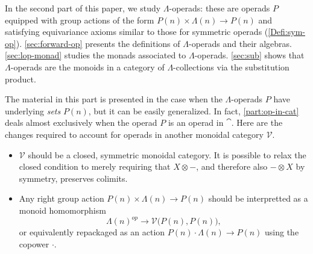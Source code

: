 

In the second part of this paper, we study $\Lambda$-operads: these are operads $P$ equipped with group actions of the form $P(n) \times \Lambda(n) \to P(n)$ and satisfying equivariance axioms similar to those for symmetric operads (\cref{Defi:sym-op}). \cref{sec:forward-op} presents the definitions of $\Lambda$-operads and their algebras.\cref{sec:lop-monad} studies the monads associated to $\Lambda$-operads. \cref{sec:sub} shows that $\Lambda$-operads are the monoids in a category of $\Lambda$-collections via the substitution product.

\begin{rem}\label{rem:lop-Venriched}
The material in this part is presented in the case when the $\Lambda$-operads $P$ have underlying \emph{sets} $P(n)$, but it can be easily generalized. In fact, \cref{part:op-in-cat} deals almost exclusively when the operad $P$ is an operad in $\cat$. Here are the changes required to account for operads in another monoidal category $\mathcal{V}$.
\begin{itemize}
\item $\mathcal{V}$ should be a closed, symmetric monoidal category. It is possible to relax the closed condition to merely requiring that $X \otimes -$, and therefore also $- \otimes X$ by symmetry, preserves colimits.
\item Any right group action $P(n) \times \Lambda(n) \to P(n)$ should be interpretted as a monoid homomorphism
\[
\Lambda(n)^{op} \to \mathcal{V} \big( P(n), P(n) \big),
\]
or equivalently repackaged as an action $P(n) \cdot \Lambda(n) \to P(n)$ using the copower $\cdot$.
\end{itemize}
\end{rem}


